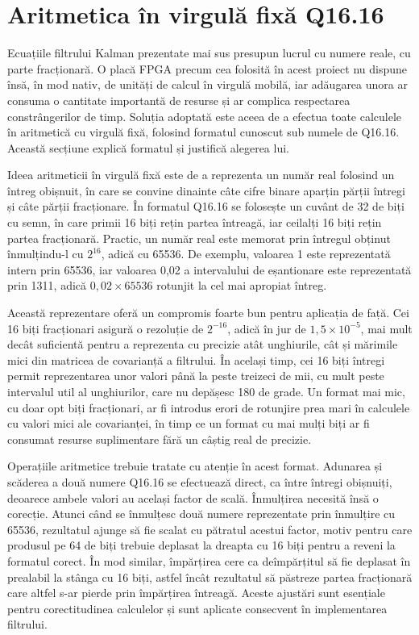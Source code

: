 \section{Aritmetica în virgulă fixă Q16.16}
\label{sec:analiza-q16}

Ecuațiile filtrului Kalman prezentate mai sus presupun lucrul cu numere reale, cu
parte fracționară. O placă FPGA precum cea folosită în acest proiect nu dispune
însă, în mod nativ, de unități de calcul în virgulă mobilă, iar adăugarea unora ar
consuma o cantitate importantă de resurse și ar complica respectarea
constrângerilor de timp. Soluția adoptată este aceea de a efectua toate calculele
în aritmetică cu virgulă fixă, folosind formatul cunoscut sub numele de Q16.16.
Această secțiune explică formatul și justifică alegerea lui.

Ideea aritmeticii în virgulă fixă este de a reprezenta un număr real folosind un
întreg obișnuit, în care se convine dinainte câte cifre binare aparțin părții
întregi și câte părții fracționare. În formatul Q16.16 se folosește un cuvânt de 32
de biți cu semn, în care primii 16 biți rețin partea întreagă, iar ceilalți 16 biți
rețin partea fracționară. Practic, un număr real este memorat prin întregul obținut
înmulțindu-l cu $2^{16}$, adică cu 65536. De exemplu, valoarea 1 este reprezentată
intern prin 65536, iar valoarea 0,02 a intervalului de eșantionare este
reprezentată prin 1311, adică $0{,}02 \times 65536$ rotunjit la cel mai apropiat
întreg.

Această reprezentare oferă un compromis foarte bun pentru aplicația de față. Cei 16
biți fracționari asigură o rezoluție de $2^{-16}$, adică în jur de
$1{,}5 \times 10^{-5}$, mai mult decât suficientă pentru a reprezenta cu precizie
atât unghiurile, cât și mărimile mici din matricea de covarianță a filtrului. În
același timp, cei 16 biți întregi permit reprezentarea unor valori până la peste
treizeci de mii, cu mult peste intervalul util al unghiurilor, care nu depășesc 180
de grade. Un format mai mic, cu doar opt biți fracționari, ar fi introdus erori de
rotunjire prea mari în calculele cu valori mici ale covarianței, în timp ce un
format cu mai mulți biți ar fi consumat resurse suplimentare fără un câștig real de
precizie.

Operațiile aritmetice trebuie tratate cu atenție în acest format. Adunarea și
scăderea a două numere Q16.16 se efectuează direct, ca între întregi obișnuiți,
deoarece ambele valori au același factor de scală. Înmulțirea necesită însă o
corecție. Atunci când se înmulțesc două numere reprezentate prin înmulțire cu
65536, rezultatul ajunge să fie scalat cu pătratul acestui factor, motiv pentru
care produsul pe 64 de biți trebuie deplasat la dreapta cu 16 biți pentru a reveni
la formatul corect. În mod similar, împărțirea cere ca deîmpărțitul să fie deplasat
în prealabil la stânga cu 16 biți, astfel încât rezultatul să păstreze partea
fracționară care altfel s-ar pierde prin împărțirea întreagă. Aceste ajustări sunt
esențiale pentru corectitudinea calculelor și sunt aplicate consecvent în
implementarea filtrului.

